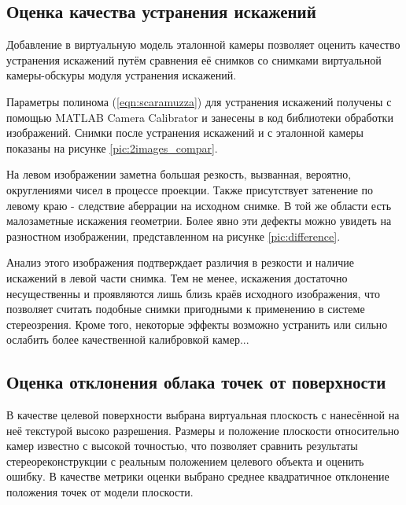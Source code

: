 
\subsection{Оценка качества устранения искажений}

Добавление в виртуальную модель эталонной камеры позволяет оценить качество устранения искажений путём сравнения
её снимков со снимками виртуальной камеры-обскуры модуля устранения искажений. %

Параметры полинома (\ref{eqn:scaramuzza}) для устранения искажений получены с помощью MATLAB Camera Calibrator и занесены 
в код библиотеки обработки изображений. %
Снимки после устранения искажений и с эталонной камеры показаны на рисунке \ref{pic:2images_compar}.


На левом изображении заметна большая резкость, вызванная, вероятно, округлениями чисел в процессе проекции. Также присутствует 
затенение по левому краю - следствие аберрации на исходном снимке. В той же области есть малозаметные искажения геометрии. Более 
явно эти дефекты можно увидеть на разностном изображении, представленном на рисунке \ref{pic:difference}. 


Анализ этого изображения подтверждает различия в резкости и наличие искажений в левой части снимка. Тем не менее, искажения
достаточно несущественны и проявляются лишь близь краёв исходного изображения, что позволяет считать подобные снимки пригодными 
к применению в системе стереозрения.  Кроме того, некоторые эффекты возможно устранить или  сильно ослабить более качественной 
калибровкой камер... %

\subsection{Оценка отклонения облака точек от поверхности}  %

В качестве целевой поверхности выбрана виртуальная плоскость с нанесённой на неё текстурой высоко разрешения. Размеры и
положение плоскости относительно камер известно с высокой точностью, что позволяет сравнить результаты стереореконструкции
с реальным положением целевого объекта и оценить ошибку. В качестве метрики оценки выбрано среднее квадратичное отклонение
положения точек от модели плоскости. 

